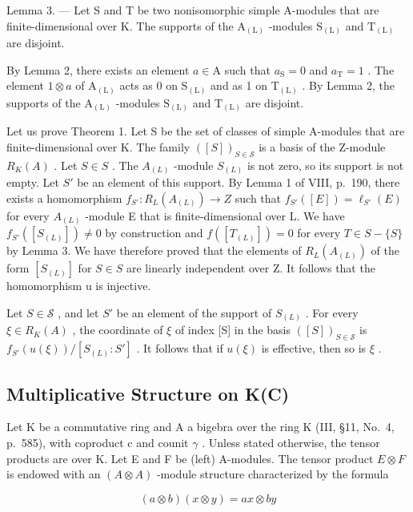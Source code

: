 Lemma 3. --- Let S and T be two nonisomorphic simple A-modules that are finite-dimensional over K. The supports of the \(\mathrm{A}_{(\mathrm{L})}\) -modules \(\mathrm{S}_{(\mathrm{L})}\) and \(\mathrm{T}_{(\mathrm{L})}\) are disjoint.

By Lemma 2, there exists an element \(a \in \mathrm{A}\) such that \(a_{\mathrm{S}} = 0\) and \(a_{\mathrm{T}} = 1\) . The element \(1 \otimes a\) of \(\mathrm{A}_{(\mathrm{L})}\) acts as 0 on \(\mathrm{S}_{(\mathrm{L})}\) and as 1 on \(\mathrm{T}_{(\mathrm{L})}\) . By Lemma 2, the supports of the \(\mathrm{A}_{(\mathrm{L})}\) -modules \(\mathrm{S}_{(\mathrm{L})}\) and \(\mathrm{T}_{(\mathrm{L})}\) are disjoint.

Let us prove Theorem 1. Let S be the set of classes of simple A-modules that are finite-dimensional over K. The family \(([S])_{S \in \mathcal{S}}\) is a basis of the Z-module \(R_{K}(A)\) . Let \(S \in S\) . The \(A_{(L)}\) -module \(S_{(L)}\) is not zero, so its support is not empty. Let \(S'\) be an element of this support. By Lemma 1 of VIII, p.~190, there exists a homomorphism \(f_{S'} : R_L(A_{(L)}) \to Z\) such that \(f_{S'}([E]) = \ell_{S'}(E)\) for every \(A_{(L)}\) -module E that is finite-dimensional over L. We have \(f_{S'}([S_{(L)}]) \neq 0\) by construction and \(f([T_{(L)}]) = 0\) for every \(T \in S - \{S\}\) by Lemma 3. We have therefore proved that the elements of \(R_L(A_{(L)})\) of the form \([S_{(L)}]\) for \(S \in S\) are linearly independent over Z. It follows that the homomorphism u is injective.

Let \(S \in \mathscr{S}\) , and let \(S'\) be an element of the support of \(S_{(L)}\) . For every \(\xi \in R_K(A)\) , the coordinate of \(\xi\) of index {[}S{]} in the basis \(([S])_{S \in \mathscr{S}}\) is \(f_{S'}(u(\xi)) / [S_{(L)} : S']\) . It follows that if \(u(\xi)\) is effective, then so is \(\xi\) .

\subsection{Multiplicative Structure on K(C)}

Let K be a commutative ring and A a bigebra over the ring K (III, §11, No.~4, p.~585), with coproduct c and counit \(\gamma\) . Unless stated otherwise, the tensor products are over K. Let E and F be (left) A-modules. The tensor product \(E \otimes F\) is endowed with an \((A \otimes A)\) -module structure characterized by the formula

\[
(a \otimes b) (x \otimes y) = a x \otimes b y\tag{11}
\]

